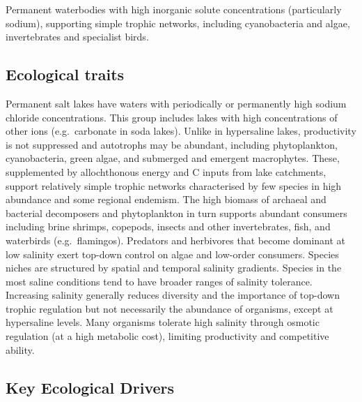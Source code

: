 \documentclass[
  letterpaper,
  DIV=11,
  numbers=noendperiod]{scrartcl}
\begin{document}
Permanent waterbodies with high inorganic solute concentrations
(particularly sodium), supporting simple trophic networks, including
cyanobacteria and algae, invertebrates and specialist birds.

\subsection{Ecological traits}\label{ecological-traits-122}

Permanent salt lakes have waters with periodically or permanently high
sodium chloride concentrations. This group includes lakes with high
concentrations of other ions (e.g.~carbonate in soda lakes). Unlike in
hypersaline lakes, productivity is not suppressed and autotrophs may be
abundant, including phytoplankton, cyanobacteria, green algae, and
submerged and emergent macrophytes. These, supplemented by allochthonous
energy and C inputs from lake catchments, support relatively simple
trophic networks characterised by few species in high abundance and some
regional endemism. The high biomass of archaeal and bacterial
decomposers and phytoplankton in turn supports abundant consumers
including brine shrimps, copepods, insects and other invertebrates,
fish, and waterbirds (e.g.~flamingos). Predators and herbivores that
become dominant at low salinity exert top-down control on algae and
low-order consumers. Species niches are structured by spatial and
temporal salinity gradients. Species in the most saline conditions tend
to have broader ranges of salinity tolerance. Increasing salinity
generally reduces diversity and the importance of top-down trophic
regulation but not necessarily the abundance of organisms, except at
hypersaline levels. Many organisms tolerate high salinity through
osmotic regulation (at a high metabolic cost), limiting productivity and
competitive ability.

\subsection{Key Ecological Drivers}\label{key-ecological-drivers-122}
\end{document}
